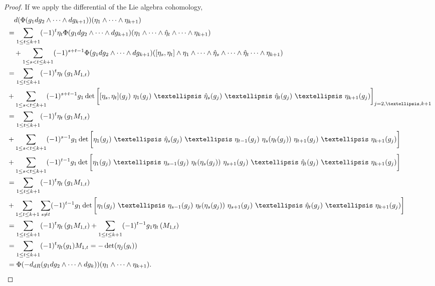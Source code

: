 \documentclass[12pt]{amsart}
\newcommand{\DR}{{\textup{dR}}}
\theoremstyle{definition}
\begin{document}
\begin{proof}
If we apply the differential of the Lie algebra cohomology, 
\begin{align*}
& \quad d(\Phi(g_1 dg_2 \wedge \cdots \wedge dg_{k+1}) )(\eta_1 \wedge \cdots \wedge \eta_{k+1}) \\
& = \sum_{1 \leq t \leq k+1} (-1)^t \eta_t \Phi(g_1 dg_2 \wedge \cdots \wedge dg_{k+1})(\eta_1 \wedge \cdots \wedge \hat{\eta}_t \wedge \cdots \wedge \eta_{k+1})\\
& \quad + \sum_{1 \leq s < t \leq k+1} (-1)^{s+t-1} \Phi(g_1 dg_2 \wedge \cdots \wedge dg_{k+1}) ([\eta_s, \eta_t] \wedge \eta_1 \wedge \cdots \wedge \hat{\eta}_s \wedge \cdots \wedge \hat{\eta}_t \cdots \wedge \eta_{k+1})\\
& = \sum_{1 \leq t \leq k+1} (-1)^t \eta_t \left(g_1 M_{1,t} \right) \\ 
& + \sum_{1 \leq s < t \leq k+1} (-1)^{s+t-1} g_1 \det\bigg[ [\eta_s, \eta_t](g_j) \ \eta_1(g_j) \ \ldots \ \hat\eta_{s}(g_j) \ \ldots \ \hat{\eta}_{t}(g_j) \ \ldots \ \eta_{k+1}(g_j)\bigg]_{j = 2, \ldots, k+1}  \\
& = \sum_{1 \leq t \leq k+1} (-1)^t \eta_t \left(g_1 M_{1,t} \right) \\ 
& + \sum_{1 \leq s < t \leq k+1} (-1)^{s-1} g_1 \det\bigg[ \eta_1(g_j) \ \ldots \  \hat\eta_{s}(g_j) \   \ldots \ \eta_{t-1}(g_j)  \ \eta_s (\eta_t(g_j)) \ \eta_{t+1}(g_j) \ \ldots \ \eta_{k+1}(g_j)\bigg]  \\
&+ \sum_{1 \leq s < t \leq k+1} (-1)^{t-1} g_1 \det\bigg[ 
\eta_1(g_j) \ \ldots \ \eta_{s-1}(g_j) \ \eta_t (\eta_s (g_j)) \ \eta_{s+1}(g_j) \ \ldots \ \hat{\eta}_{t}(g_j)  \ \ldots \ \eta_{k+1}(g_j) \bigg]\\
& = \sum_{1 \leq t \leq k+1} (-1)^t \eta_t \left(g_1 M_{1,t} \right) \\ 
&+ \sum_{1 \leq t \leq k+1} \sum_{s \neq t} (-1)^{t-1} g_1 \det\bigg[ 
\eta_1(g_j) \ \ldots \ \eta_{s-1}(g_j) \ \eta_t (\eta_s (g_j)) \ \eta_{s+1}(g_j) \ \ldots \ \hat{\eta}_{t}(g_j)  \ \ldots \ \eta_{k+1}(g_j) \bigg]\\
& = \sum_{1 \leq t \leq k+1} (-1)^t \eta_t \left(g_1 M_{1,t} \right)
+ \sum_{1 \leq t \leq k+1} (-1)^{t-1} g_1 \eta_t \left( M_{1,t} \right) \\
& = \sum_{1 \leq t \leq k+1} (-1)^t \eta_t(g_1) M_{1,t} =  - \det(\eta_j(g_i))\\
& = \Phi(-d_{\DR}(g_1 dg_2 \wedge \cdots \wedge dg_k))(\eta_1\wedge \cdots \wedge \eta_{k+1}).
\end{align*}


\end{proof}
\end{document}
